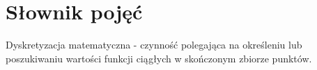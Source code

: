 \chapter*{Słownik pojęć}
Dyskretyzacja matematyczna - czynność polegająca na określeniu lub poszukiwaniu wartości funkcji ciągłych w skończonym zbiorze punktów.
